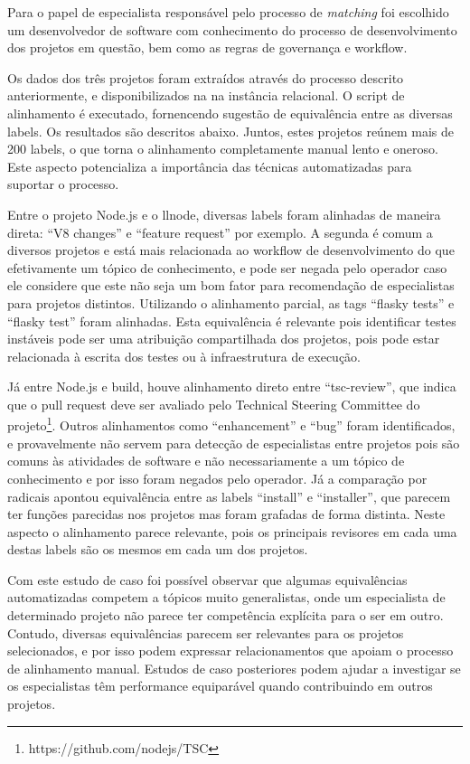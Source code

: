 \documentclass[sigconf]{acmart}
\begin{document}
Para o papel de especialista responsável pelo processo de \textit{matching} foi escolhido um desenvolvedor de software com conhecimento do processo de desenvolvimento dos projetos em questão, bem como as regras de governança e workflow.

Os dados dos três projetos foram extraídos através do processo descrito anteriormente, e disponibilizados na na instância relacional. O script de alinhamento é executado, fornencendo sugestão de equivalência entre as diversas labels. Os resultados são descritos abaixo. Juntos, estes projetos reúnem mais de 200 labels, o que torna o alinhamento completamente manual lento e oneroso. Este aspecto potencializa a importância das técnicas automatizadas para suportar o processo.

Entre o projeto Node.js e o llnode, diversas labels foram alinhadas de maneira direta: ``V8 changes'' e ``feature request'' por exemplo. A segunda é comum a diversos projetos e está mais relacionada ao workflow de desenvolvimento do que efetivamente um tópico de conhecimento, e pode ser negada pelo operador caso ele considere que este não seja um bom fator para recomendação de especialistas para projetos distintos. Utilizando o alinhamento parcial, as tags ``flasky tests'' e ``flasky test'' foram alinhadas. Esta equivalência é relevante pois identificar testes instáveis pode ser uma atribuição compartilhada dos projetos, pois pode estar relacionada à escrita dos testes ou à infraestrutura de execução.

Já entre Node.js e build, houve alinhamento direto entre ``tsc-review'', que indica que o pull request deve ser avaliado pelo Technical Steering Committee do projeto\footnote{https://github.com/nodejs/TSC}. Outros alinhamentos como ``enhancement'' e ``bug'' foram identificados, e provavelmente não servem para detecção de especialistas entre projetos pois são comuns às atividades de software e não necessariamente a um tópico de conhecimento e por isso foram negados pelo operador. Já a comparação por radicais apontou equivalência entre as labels ``install'' e ``installer'', que parecem ter funções parecidas nos projetos mas foram grafadas de forma distinta. Neste aspecto o alinhamento parece relevante, pois os principais revisores em cada uma destas labels são os mesmos em cada um dos projetos.

Com este estudo de caso foi possível observar que algumas equivalências automatizadas competem a tópicos muito generalistas, onde um especialista de determinado projeto não parece ter competência explícita para o ser em outro. Contudo, diversas equivalências parecem ser relevantes para os projetos selecionados, e por isso podem expressar relacionamentos que apoiam o processo de alinhamento manual. Estudos de caso posteriores podem ajudar a investigar se os especialistas têm performance equiparável quando contribuindo em outros projetos.
\end{document}
